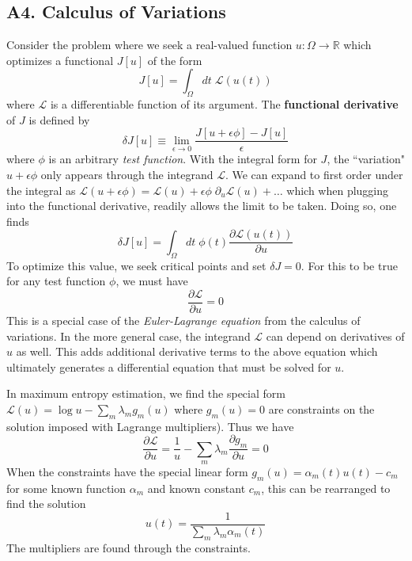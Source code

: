 \documentclass[twocolumn]{gwclass}
\newcommand{\R}{\mathbb{R}}
\begin{document}
\subsection*{A4. Calculus of Variations}
Consider the problem where we seek a real-valued function $u:\Omega\to\R$ which optimizes a functional $J[u]$ of the form
$$ J[u] = \int_\Omega dt\; \mathscr{L}(u(t)) $$
where $\mathscr{L}$ is a differentiable function of its argument. The \textbf{functional derivative} of $J$ is defined by
$$ \delta J [u] \equiv \lim_{\epsilon\to 0}\frac{J[u+\epsilon\phi] - J[u]}{\epsilon}$$
where $\phi$ is an arbitrary \emph{test function}. With the integral form for $J$, the ``variation" $u+\epsilon\phi$ only appears through the integrand $\mathscr{L}$. We can expand to first order under the integral as  $\mathscr{L}(u+\epsilon\phi) = \mathscr{L}(u) + \epsilon \phi\; \partial_u\mathscr{L}(u) + \dots$ which when plugging into the functional derivative, readily allows the limit to be taken. Doing so, one finds
$$ \delta J[u] = \int_\Omega dt\;\phi(t) \frac{\partial\mathscr{L}(u(t))}{\partial u} $$
To optimize this value, we seek critical points and set $\delta J=0$. For this to be true for any test function $\phi$, we must have
$$ \frac{\partial\mathscr{L}}{\partial u} = 0 $$
This is a special case of the \emph{Euler-Lagrange equation} from the calculus of variations. In the more general case, the integrand $\mathscr{L}$ can depend on derivatives of $u$ as well. This adds additional derivative terms to the above equation which ultimately generates a differential equation that must be solved for $u$. 

In maximum entropy estimation, we find the special form $\mathscr{L}(u) = \log u - \sum_m\lambda_m g_m(u)$ where $g_m(u)=0$ are constraints on the solution imposed with Lagrange multipliers). Thus we have
$$ \frac{\partial\mathscr{L}}{\partial u} = \frac{1}{u} - \sum_m \lambda_m \frac{\partial g_m}{\partial u} = 0 $$
When the constraints have the special linear form $g_m(u) = \alpha_m(t) u(t) -c_m$ for some known function $\alpha_m$ and known constant $c_m$, this can be rearranged to find the solution
$$ u(t) = \frac{1}{\displaystyle\sum_m \lambda_m \alpha_m(t)}$$
The multipliers are found through the constraints.



	
\end{document}
